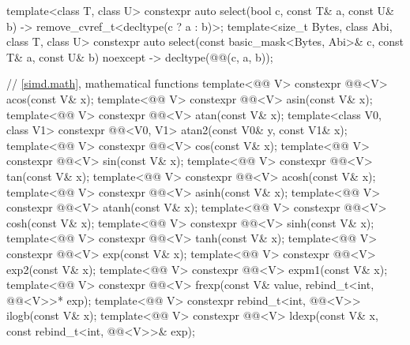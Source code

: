 \begin{codeblock}
{  template<class T, class U>
    constexpr auto select(bool c, const T& a, const U& b)
    -> remove_cvref_t<decltype(c ? a : b)>;
  template<size_t Bytes, class Abi, class T, class U>
    constexpr auto select(const basic_mask<Bytes, Abi>& c, const T& a, const U& b)
    noexcept -> decltype(@@(c, a, b));

  // \ref{simd.math}, mathematical functions
  template<@@ V> constexpr @@<V> acos(const V& x);
  template<@@ V> constexpr @@<V> asin(const V& x);
  template<@@ V> constexpr @@<V> atan(const V& x);
  template<class V0, class V1>
    constexpr @@<V0, V1> atan2(const V0& y, const V1& x);
  template<@@ V> constexpr @@<V> cos(const V& x);
  template<@@ V> constexpr @@<V> sin(const V& x);
  template<@@ V> constexpr @@<V> tan(const V& x);
  template<@@ V> constexpr @@<V> acosh(const V& x);
  template<@@ V> constexpr @@<V> asinh(const V& x);
  template<@@ V> constexpr @@<V> atanh(const V& x);
  template<@@ V> constexpr @@<V> cosh(const V& x);
  template<@@ V> constexpr @@<V> sinh(const V& x);
  template<@@ V> constexpr @@<V> tanh(const V& x);
  template<@@ V> constexpr @@<V> exp(const V& x);
  template<@@ V> constexpr @@<V> exp2(const V& x);
  template<@@ V> constexpr @@<V> expm1(const V& x);
  template<@@ V>
    constexpr @@<V>
      frexp(const V& value, rebind_t<int, @@<V>>* exp);
  template<@@ V>
    constexpr rebind_t<int, @@<V>> ilogb(const V& x);
  template<@@ V>
    constexpr @@<V> ldexp(const V& x, const rebind_t<int, @@<V>>& exp);
}
\end{codeblock}

